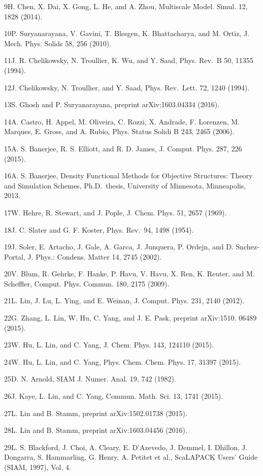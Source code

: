 \documentclass[
  10
]{article}
\begin{document}
9H. Chen, X. Dai, X. Gong, L. He, and A. Zhou, Multiscale Model. Simul.
12, 1828 (2014).

10P. Suryanarayana, V. Gavini, T. Blesgen, K. Bhattacharya, and M.
Ortiz, J. Mech. Phys. Solids 58, 256 (2010).

11J. R. Chelikowsky, N. Troullier, K. Wu, and Y. Saad, Phys. Rev.~B 50,
11355 (1994).

12J. Chelikowsky, N. Troullier, and Y. Saad, Phys. Rev.~Lett. 72, 1240
(1994).

13S. Ghosh and P. Suryanarayana, preprint arXiv:1603.04334 (2016).

14A. Castro, H. Appel, M. Oliveira, C. Rozzi, X. Andrade, F. Lorenzen,
M. Marques, E. Gross, and A. Rubio, Phys. Status Solidi B 243, 2465
(2006).

15A. S. Banerjee, R. S. Elliott, and R. D. James, J. Comput. Phys. 287,
226 (2015).

16A. S. Banerjee, Density Functional Methods for Objective Structures:
Theory and Simulation Schemes, Ph.D.~thesis, University of Minnesota,
Minneapolis, 2013.

17W. Hehre, R. Stewart, and J. Pople, J. Chem. Phys. 51, 2657 (1969).

18J. C. Slater and G. F. Koster, Phys. Rev.~94, 1498 (1954).

19J. Soler, E. Artacho, J. Gale, A. Garca, J. Junquera, P. Ordejn, and
D. Snchez-Portal, J. Phys.: Condens. Matter 14, 2745 (2002).

20V. Blum, R. Gehrke, F. Hanke, P. Havu, V. Havu, X. Ren, K. Reuter, and
M. Scheffler, Comput. Phys. Commun. 180, 2175 (2009).

21L. Lin, J. Lu, L. Ying, and E. Weinan, J. Comput. Phys. 231, 2140
(2012).

22G. Zhang, L. Lin, W. Hu, C. Yang, and J. E. Pask, preprint arXiv:1510.
06489 (2015).

23W. Hu, L. Lin, and C. Yang, J. Chem. Phys. 143, 124110 (2015).

24W. Hu, L. Lin, and C. Yang, Phys. Chem. Chem. Phys. 17, 31397 (2015).

25D. N. Arnold, SIAM J. Numer. Anal. 19, 742 (1982).

26J. Kaye, L. Lin, and C. Yang, Commun. Math. Sci. 13, 1741 (2015).

27L. Lin and B. Stamm, preprint arXiv:1502.01738 (2015).

28L. Lin and B. Stamm, preprint arXiv:1603.04456 (2016).

29L. S. Blackford, J. Choi, A. Cleary, E. D'Azevedo, J. Demmel, I.
Dhillon, J. Dongarra, S. Hammarling, G. Henry, A. Petitet et al.,
ScaLAPACK Users' Guide (SIAM, 1997), Vol. 4.
\end{document}
